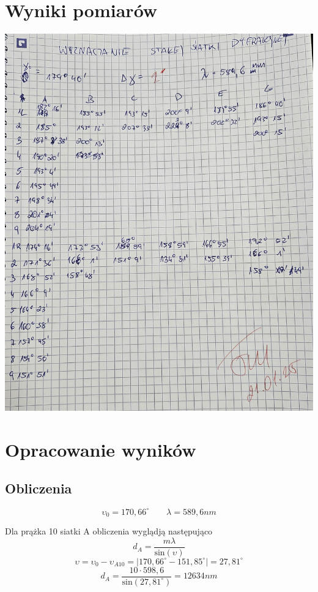 \documentclass[a4paper, 11pt]{article}
\begin{document}

\section{Wyniki pomiarów}\label{sec:wyniki_pomiarow} %
\begin{center}
	\includegraphics[scale=0.2]{pictures/20250121_124928.jpg}
\end{center}

\section{Opracowanie wyników}\label{sec:opracowanie_wynikow} %

\subsection{Obliczenia}\label{sub:obliczenia} %
\[
	\upsilon_0 = 170,66^{\circ} \qquad \lambda = 589,6 nm
\]

Dla prążka 10 siatki A obliczenia wyglądją następująco
\[
	d_A = \frac{m\lambda}{\text{sin}(\upsilon)}
\]
\[
	\upsilon = \upsilon_0 - \upsilon_{A10} = \left| 170,66^{\circ} - 151,85^{\circ} \right| = 27,81^{\circ}
\]
\[
	d_A = \frac{10 \cdot 598,6}{\text{sin}(27,81^{\circ})} = 12634 nm
\]
\end{document}
